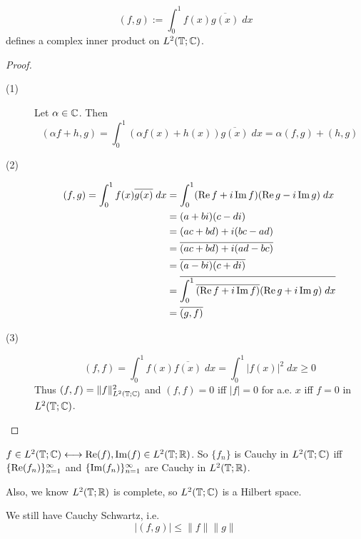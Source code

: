 \begin{prop}
    \[
        (f, g) := \int_0^1 f(x) \overline{g(x)} \; dx
    \] 
    defines a complex inner product on $L^2(\mathbb{T}; \mathbb{C})$.
\end{prop}
\begin{proof} \leavevmode
    \begin{description}
        \item[(1)] Let $\alpha \in \mathbb{C}$. Then
        \[
            (\alpha f + h, g) = \int_0^1 (\alpha f(x) + h(x)) \overline{g(x)} \; dx = \alpha (f, g) + (h, g)
        \]  
        \item[(2)] 
        \begin{align*}
            (f, g) = \int_0^1 f(x) \overline{g(x)} \; dx &= \int_0^1 (\operatorname{Re} f + i \operatorname{Im} f)(\operatorname{Re} g - i \operatorname{Im} g) \; dx \\
            &= (a + bi) (c - di) \\
            &= (ac + bd) + i (bc - ad) \\
            &= \overline{(ac + bd) + i (ad - bc)} \\
            &= \overline{(a-bi) (c + di)} \\
            &= \overline{\int_0^1 \overline{(\operatorname{Re} f + i \operatorname{Im} f)} (\operatorname{Re} g + i \operatorname{Im} g) \; dx} \\
            &= \overline{(g, f)}
        \end{align*}
        \item[(3)] 
        \[
            (f, f) = \int_0^1 f(x) \overline{f(x)} \; dx = \int_0^1 |f(x)|^2 \; dx \geq 0  
        \] 
        Thus $(f, f) = \| f \|_{L^2(\mathbb{T}; \mathbb{C})}^2 $ and $(f, f) = 0 $ iff $|f| = 0$ for 
        a.e. $x$ iff $f = 0$ in $L^2(\mathbb{T}; \mathbb{C})$. \qedhere   
    \end{description}
\end{proof}

\begin{rem}
    $f \in L^2(\mathbb{T}; \mathbb{C}) \longleftrightarrow \operatorname{Re} (f), \operatorname{Im} (f) \in L^2(\mathbb{T}; \mathbb{R})$.
    So $\{f_n \}$ is Cauchy in $L^2(\mathbb{T}; \mathbb{C})$ iff 
$\{ \operatorname{Re} (f_n) \}_{n=1}^\infty$ and $\{ \operatorname{Im} (f_n) \}_{n=1}^\infty$ are Cauchy in $L^2(\mathbb{T}; \mathbb{R})$.

Also, we know $L^2(\mathbb{T}; \mathbb{R})$ is complete, so $L^2(\mathbb{T}; \mathbb{C})$ is a Hilbert space.   
\end{rem}
\begin{rem}
    We still have Cauchy Schwartz, i.e. 
    \[
        |(f, g)| \leq \| f \| \| g \|  
    \] 
\end{rem}

